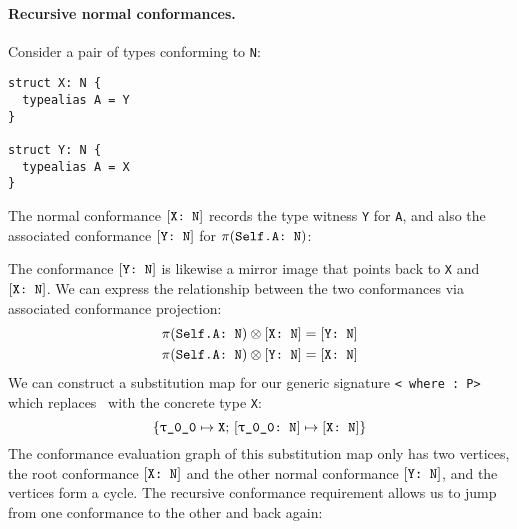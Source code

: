 \documentclass[../generics]{subfiles}
\begin{document}
\paragraph{Recursive normal conformances.} Consider a pair of types conforming to \texttt{N}:
\begin{Verbatim}
struct X: N {
  typealias A = Y
}

struct Y: N {
  typealias A = X
}
\end{Verbatim}
The normal conformance $[\texttt{X:~N}]$ records the type witness \verb|Y| for \verb|A|, and also the associated conformance $[\texttt{Y:~N}]$ for $\pi(\texttt{Self.A:~N})$:
\begin{center}
\end{center}
The conformance $[\texttt{Y:~N}]$ is likewise a mirror image that points back to \verb|X| and $[\texttt{X:~N}]$. We can express the relationship between the two conformances via associated conformance projection:
\begin{gather*}
\pi(\texttt{Self.A:~N}) \otimes [\texttt{X:~N}] = [\texttt{Y:~N}]\\
\pi(\texttt{Self.A:~N}) \otimes [\texttt{Y:~N}] = [\texttt{X:~N}]
\end{gather*}
%
%
We can construct a substitution map for our generic signature \texttt{<\rT\ where \rT:\ P>} which replaces \rT\ with the concrete type \texttt{X}:
\[\SubstMapC{\SubstType{\rT}{X}}{\SubstConf{\rT}{X}{N}}\]
The conformance evaluation graph of this substitution map only has two vertices, the root conformance $[\texttt{X:~N}]$ and the other normal conformance $[\texttt{Y:~N}]$, and the vertices form a cycle. The recursive conformance requirement allows us to jump from one conformance to the other and back again:
\begin{center}
\end{center}
\end{document}
